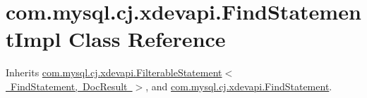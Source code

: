 \hypertarget{classcom_1_1mysql_1_1cj_1_1xdevapi_1_1_find_statement_impl}{}\section{com.\+mysql.\+cj.\+xdevapi.\+Find\+Statement\+Impl Class Reference}
\label{classcom_1_1mysql_1_1cj_1_1xdevapi_1_1_find_statement_impl}


Inherits \mbox{\hyperlink{classcom_1_1mysql_1_1cj_1_1xdevapi_1_1_filterable_statement}{com.\+mysql.\+cj.\+xdevapi.\+Filterable\+Statement$<$ Find\+Statement, Doc\+Result $>$}}, and \mbox{\hyperlink{interfacecom_1_1mysql_1_1cj_1_1xdevapi_1_1_find_statement}{com.\+mysql.\+cj.\+xdevapi.\+Find\+Statement}}.


